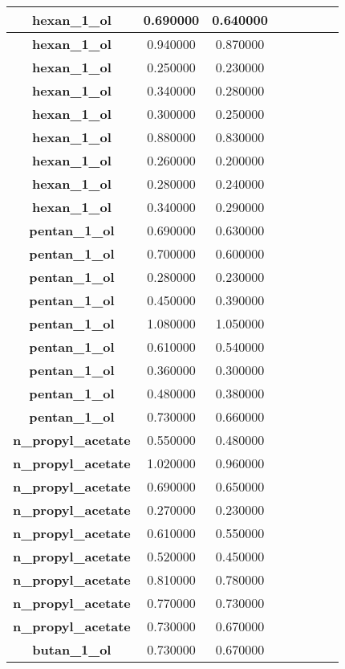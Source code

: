\documentclass{amsart}
\begin{document}
\begin{center}
\begin{tabular}{c|c|c|c|c|c|c|c}
\textbf{hexan\_1\_ol}&0.690000&0.640000 \\ \hline 
\textbf{hexan\_1\_ol}&0.940000&0.870000 \\ \hline 
\textbf{hexan\_1\_ol}&0.250000&0.230000 \\ \hline 
\textbf{hexan\_1\_ol}&0.340000&0.280000 \\ \hline 
\textbf{hexan\_1\_ol}&0.300000&0.250000 \\ \hline 
\textbf{hexan\_1\_ol}&0.880000&0.830000 \\ \hline 
\textbf{hexan\_1\_ol}&0.260000&0.200000 \\ \hline 
\textbf{hexan\_1\_ol}&0.280000&0.240000 \\ \hline 
\textbf{hexan\_1\_ol}&0.340000&0.290000 \\ \hline 
\textbf{pentan\_1\_ol}&0.690000&0.630000 \\ \hline 
\textbf{pentan\_1\_ol}&0.700000&0.600000 \\ \hline 
\textbf{pentan\_1\_ol}&0.280000&0.230000 \\ \hline 
\textbf{pentan\_1\_ol}&0.450000&0.390000 \\ \hline 
\textbf{pentan\_1\_ol}&1.080000&1.050000 \\ \hline 
\textbf{pentan\_1\_ol}&0.610000&0.540000 \\ \hline 
\textbf{pentan\_1\_ol}&0.360000&0.300000 \\ \hline 
\textbf{pentan\_1\_ol}&0.480000&0.380000 \\ \hline 
\textbf{pentan\_1\_ol}&0.730000&0.660000 \\ \hline 
\textbf{n\_propyl\_acetate}&0.550000&0.480000 \\ \hline 
\textbf{n\_propyl\_acetate}&1.020000&0.960000 \\ \hline 
\textbf{n\_propyl\_acetate}&0.690000&0.650000 \\ \hline 
\textbf{n\_propyl\_acetate}&0.270000&0.230000 \\ \hline 
\textbf{n\_propyl\_acetate}&0.610000&0.550000 \\ \hline 
\textbf{n\_propyl\_acetate}&0.520000&0.450000 \\ \hline 
\textbf{n\_propyl\_acetate}&0.810000&0.780000 \\ \hline 
\textbf{n\_propyl\_acetate}&0.770000&0.730000 \\ \hline 
\textbf{n\_propyl\_acetate}&0.730000&0.670000 \\ \hline 
\textbf{butan\_1\_ol}&0.730000&0.670000 \\ \hline 

\end{tabular}
\end{center}
\end{document}
